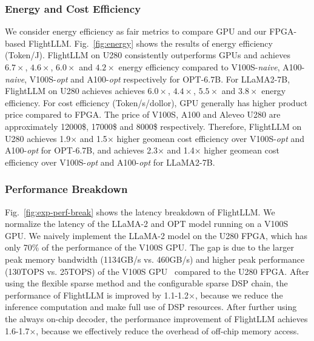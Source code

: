 \vspace{-5pt}
\subsubsection{Energy and Cost Efficiency}
We consider energy efficiency as fair metrics to compare GPU and our FPGA-based FlightLLM. Fig.~\ref{fig:energy} shows the results of energy efficiency (Token/J). FlightLLM on U280 consistently outperforms GPUs and achieves $6.7\times$, $4.6\times$, $6.0\times$ and $4.2\times$ energy efficiency compared to V100S-\textit{naive}, A100-\textit{naive}, V100S-\textit{opt} and A100-\textit{opt} respectively for OPT-6.7B. For LLaMA2-7B, FlightLLM on U280 achieves achieves $6.0\times$, $4.4\times$, $5.5\times$ and $3.8\times$ energy efficiency.
For cost efficiency (Token/s/dollor), GPU generally has higher product price compared to FPGA. The price of V100S, A100 and Aleveo U280 are approximately 12000\$, 17000\$ and 8000\$ respectively. Therefore, FlightLLM on U280 achieves 1.9$\times$ and 1.5$\times$ higher geomean cost efficiency over V100S-\textit{opt} and A100-\textit{opt} for OPT-6.7B, and achieves 2.3$\times$ and 1.4$\times$ higher geomean cost efficiency over V100S-\textit{opt} and A100-\textit{opt} for LLaMA2-7B.

\vspace{-5pt}
\subsubsection{Performance Breakdown}
Fig.~\ref{fig:exp-perf-break} shows the latency breakdown of FlightLLM. We normalize the latency of the LLaMA-2 and OPT model running on a V100S GPU. We naively implement the LLaMA-2 model on the U280 FPGA, which has only 70\% of the performance of the V100S GPU. The gap is due to the larger peak memory bandwidth (1134GB/s vs. 460GB/s) and higher peak performance (130TOPS vs. 25TOPS) of the V100S GPU~\cite{a100-2021} compared to the U280 FPGA. After using the flexible sparse method and the configurable sparse DSP chain, the performance of FlightLLM is improved by 1.1-1.2$\times$, because we reduce the inference computation and make full use of DSP resources. After further using the always on-chip decoder, the performance improvement of FlightLLM achieves 1.6-1.7$\times$, because we effectively reduce the overhead of off-chip memory access.
\vspace{-5pt}
\subsubsection{}

